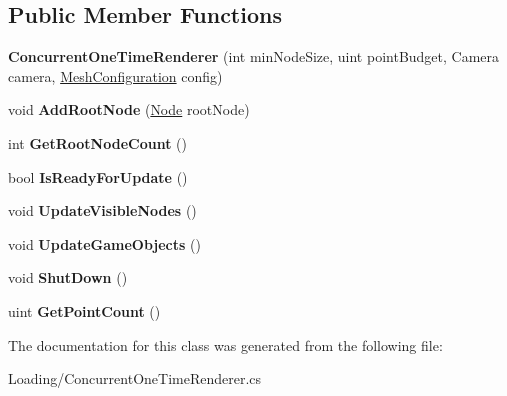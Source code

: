 \subsection*{Public Member Functions}
\begin{DoxyCompactItemize}
\item 
\mbox{\label{class_loading_1_1_concurrent_one_time_renderer_ad51208fab2b19f9641b0143d9138101f}} 
{\bfseries Concurrent\+One\+Time\+Renderer} (int min\+Node\+Size, uint point\+Budget, Camera camera, \hyperlink{class_object_creation_1_1_mesh_configuration}{Mesh\+Configuration} config)
\item 
\mbox{\label{class_loading_1_1_concurrent_one_time_renderer_a60a4f399a0640015374a5c31e7ea20ce}} 
void {\bfseries Add\+Root\+Node} (\hyperlink{class_cloud_data_1_1_node}{Node} root\+Node)
\item 
\mbox{\label{class_loading_1_1_concurrent_one_time_renderer_afaf15e37da51bde9eb28474b77e1e2c6}} 
int {\bfseries Get\+Root\+Node\+Count} ()
\item 
\mbox{\label{class_loading_1_1_concurrent_one_time_renderer_a8484b61d6d8f790acb3760835c309d39}} 
bool {\bfseries Is\+Ready\+For\+Update} ()
\item 
\mbox{\label{class_loading_1_1_concurrent_one_time_renderer_a86dccdf9d91c01272901bc8f6c106939}} 
void {\bfseries Update\+Visible\+Nodes} ()
\item 
\mbox{\label{class_loading_1_1_concurrent_one_time_renderer_a4b6e2f1b866ba77102e3db297cc53d0c}} 
void {\bfseries Update\+Game\+Objects} ()
\item 
\mbox{\label{class_loading_1_1_concurrent_one_time_renderer_a5174a5558f8fb4221cf0b29264108d17}} 
void {\bfseries Shut\+Down} ()
\item 
\mbox{\label{class_loading_1_1_concurrent_one_time_renderer_a9aa238b23680098aab7a36f1dd9363d5}} 
uint {\bfseries Get\+Point\+Count} ()
\end{DoxyCompactItemize}


The documentation for this class was generated from the following file\+:\begin{DoxyCompactItemize}
\item 
Loading/Concurrent\+One\+Time\+Renderer.\+cs\end{DoxyCompactItemize}
